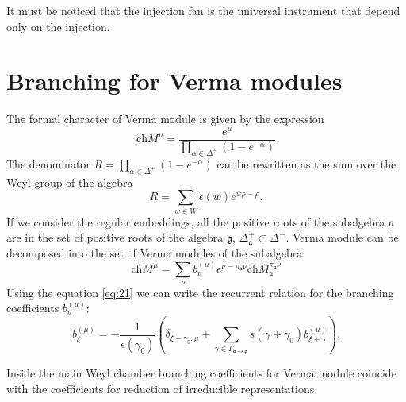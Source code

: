 \documentclass[12pt]{article}
\theoremstyle{definition}
\newcommand{\gf}{\mathfrak{g}}
\newcommand{\af}{\mathfrak{a}}
\begin{document}
It must be noticed that the injection fan is the universal instrument that
depend only on the injection.


\section{Branching for Verma modules}
\label{sec:branching-verma}

The formal character of Verma module is given by the expression
\begin{equation}
  \label{eq:17}
  \mathrm{ch} M^{\mu}=\frac{e^{\mu}}{\prod_{\alpha\in \Delta^{+}} \left(1-e^{-\alpha}\right)}
\end{equation}
The denominator $R=\prod_{\alpha\in \Delta^{+}} \left(1-e^{-\alpha}\right)$ can be rewritten as the sum over the Weyl group of the algebra
\begin{equation}
  \label{eq:20}
  R=\sum_{w\in W} \epsilon(w) e^{w\rho-\rho}.
\end{equation}
If we consider the regular embeddings, all the positive roots of the subalgebra $\af$ are in the set of positive roots of the algebra $\gf$, $\Delta^{+}_{\af}\subset \Delta^{+}$. Verma module can be decomposed into the set of Verma modules of the subalgebra:
\begin{equation}
  \label{eq:18}
  \mathrm{ch}M^{\mu}=\sum_{\nu}b^{(\mu)}_{\nu} e^{\nu-\pi_{\af}\nu} \mathrm{ch}M^{\pi_{\af}\nu}_{\af}
\end{equation}
Using the equation \eqref{eq:21} we can write the recurrent relation for the branching coefficients $b^{(\mu)}_{\nu}$:
\begin{equation}
  \label{eq:19}
   b_{\xi }^{\left( \mu \right) }=-\frac{1}{s\left( \gamma _{0}\right) }\left(
        \delta_{\xi-\gamma_0,\mu}
        +\sum_{\gamma \in
          \Gamma _{\af \rightarrow \gf}}s\left( \gamma +\gamma _{0}\right) b_{\xi
          +\gamma }^{\left( \mu \right) }\right).
\end{equation}

Inside the main Weyl chamber branching coefficients for Verma module coincide with the coefficients
for reduction of irreducible representations.
\end{document}
